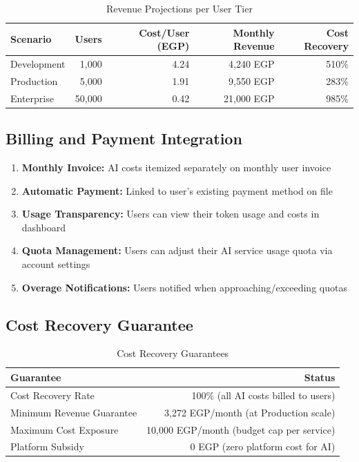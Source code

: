 \documentclass[11pt,a4paper]{article}
\begin{document}
\begin{table}[H]
\centering
\begin{tabular}{|l|r|r|r|r|}
\hline
\textbf{Scenario} & \textbf{Users} & \textbf{Cost/User (EGP)} & \textbf{Monthly Revenue} & \textbf{Cost Recovery} \\
\hline
Development & 1,000 & 4.24 & 4,240 EGP & 510\% \\
\hline
Production & 5,000 & 1.91 & 9,550 EGP & 283\% \\
\hline
Enterprise & 50,000 & 0.42 & 21,000 EGP & 985\% \\
\hline
\end{tabular}
\caption{Revenue Projections per User Tier}
\end{table}

\subsection{Billing and Payment Integration}

\begin{enumerate}[leftmargin=2em]
    \item \textbf{Monthly Invoice:} AI costs itemized separately on monthly user invoice
    \item \textbf{Automatic Payment:} Linked to user's existing payment method on file
    \item \textbf{Usage Transparency:} Users can view their token usage and costs in dashboard
    \item \textbf{Quota Management:} Users can adjust their AI service usage quota via account settings
    \item \textbf{Overage Notifications:} Users notified when approaching/exceeding quotas
\end{enumerate}

\subsection{Cost Recovery Guarantee}

\begin{table}[H]
\centering
\begin{tabular}{|l|r|}
\hline
\textbf{Guarantee} & \textbf{Status} \\
\hline
Cost Recovery Rate & 100\% (all AI costs billed to users) \\
\hline
Minimum Revenue Guarantee & 3,272 EGP/month (at Production scale) \\
\hline
Maximum Cost Exposure & 10,000 EGP/month (budget cap per service) \\
\hline
Platform Subsidy & 0 EGP (zero platform cost for AI) \\
\hline
\end{tabular}
\caption{Cost Recovery Guarantees}
\end{table}
\end{document}
